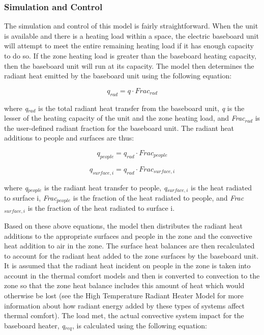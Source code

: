 \subsubsection{Simulation and Control}\label{simulation-and-control-002}

The simulation and control of this model is fairly straightforward. When the unit is available and there is a heating load within a space, the electric baseboard unit will attempt to meet the entire remaining heating load if it has enough capacity to do so. If the zone heating load is greater than the baseboard heating capacity, then the baseboard unit will run at its capacity. The model then determines the radiant heat emitted by the baseboard unit using the following equation:

\begin{equation}
{q_{rad}} = q \cdot Fra{c_{rad}}
\end{equation}

where \emph{q\(_{rad}\)} is the total radiant heat transfer from the baseboard unit, \emph{q} is the lesser of the heating capacity of the unit and the zone heating load, and \emph{Frac\(_{rad}\)} is the user-defined radiant fraction for the baseboard unit. The radiant heat additions to people and surfaces are thus:

\begin{equation}
{q_{people}} = {q_{rad}} \cdot Fra{c_{people}}
\end{equation}

\begin{equation}
{q_{surface,i}} = {{q_{rad}} \cdot Fra{c_{surface,i}}}
\end{equation}

where \emph{q\(_{people}\)} is the radiant heat transfer to people, \emph{q\(_{surface,i}\)} is the heat radiated to surface i, \emph{Frac\(_{people}\)} is the fraction of the heat radiated to people, and \emph{Frac\(_{surface,i}\)} is the fraction of the heat radiated to surface i.

Based on these above equations, the model then distributes the radiant heat additions to the appropriate surfaces and people in the zone and the convective heat addition to air in the zone. The surface heat balances are then recalculated to account for the radiant heat added to the zone surfaces by the baseboard unit. It is assumed that the radiant heat incident on people in the zone is taken into account in the thermal comfort models and then is converted to convection to the zone so that the zone heat balance includes this amount of heat which would otherwise be lost (see the High Temperature Radiant Heater Model for more information about how radiant energy added by these types of systems affect thermal comfort). The load met, the actual convective system impact for the baseboard heater, \emph{q\(_{req}\)}, is calculated using the following equation:

